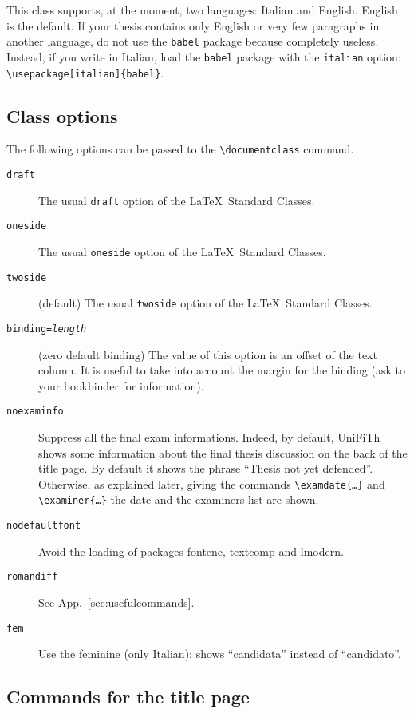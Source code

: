 \documentclass[a5paper,11pt]{article}
\newcommand{\bs}{\textbackslash}
\begin{document}
This class supports, at the moment, two languages: Italian and English. English is the default.
If your thesis contains only English or very few paragraphs in another language, do not use the \texttt{babel} package because completely useless. Instead, if you write in Italian, load the \texttt{babel} package with the
\texttt{italian} option: \texttt{\bs usepackage[italian]\{babel\}}.

\subsection{Class options}
\label{class_options}
The following options can be passed to the \texttt{\bs documentclass} command.

\begin{description}

\item[\texttt{draft}] The usual \texttt{draft} option of the \LaTeX\ Standard Classes.
\item[\texttt{oneside}] The usual \texttt{oneside} option of the \LaTeX\ Standard Classes.
\item[\texttt{twoside}] (default) The usual \texttt{twoside} option of the \LaTeX\ Standard Classes.

\item[\texttt{binding=\textsl{length}}] (zero default binding)
The value of this option is an offset of the text column.
It is useful to take into account the margin for the binding (ask to your bookbinder for information).
\item[\texttt{noexaminfo}] Suppress all the final exam informations. Indeed, by default, \textsf{UniFiTh} shows some information about the final thesis discussion on the back of the title page. By default it shows the phrase ``Thesis not yet defended''. Otherwise, as explained later, giving the commands 
\texttt{\bs examdate\{\dots\}} and \texttt{\bs examiner\{\dots\}} the date and
the examiners list are shown.
\item[\texttt{nodefaultfont}] Avoid the loading of packages \textsf{fontenc}, \textsf{textcomp} and \textsf{lmodern}.
\item[\texttt{romandiff}] See App.~\ref{sec:usefulcommands}.
\item[\texttt{fem}] Use the feminine (only Italian): shows ``candidata'' instead of ``candidato''.
\end{description}

\subsection[Commands for the\\ title page]{Commands for the title page}
\label{commands_titlepage}
\end{document}
